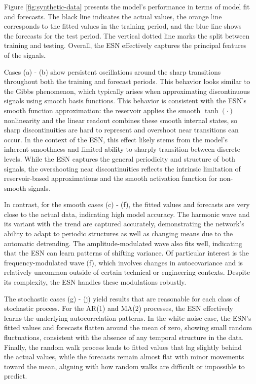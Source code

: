Figure \ref{fig:synthetic-data} presents the model's performance in terms of model fit and forecasts. The black line indicates the actual values, the orange line corresponds to the fitted values in the training period, and the blue line shows the forecasts for the test period. The vertical dotted line marks the split between training and testing. Overall, the ESN effectively captures the principal features of the signals.

Cases (a) - (b) show persistent oscillations around the sharp transitions throughout both the training and forecast periods. This behavior looks similar to the Gibbs phenomenon, which typically arises when approximating discontinuous signals using smooth basis functions. This behavior is consistent with the ESN's smooth function approximation: the reservoir applies the smooth \(\tanh(\cdot)\) nonlinearity and the linear readout combines these smooth internal states, so sharp discontinuities are hard to represent and overshoot near transitions can occur. In the context of the ESN, this effect likely stems from the model's inherent smoothness and limited ability to sharply transition between discrete levels. While the ESN captures the general periodicity and structure of both signals, the overshooting near discontinuities reflects the intrinsic limitation of reservoir-based approximations and the smooth activation function for non-smooth signals.

In contrast, for the smooth cases (c) - (f), the fitted values and forecasts are very close to the actual data, indicating high model accuracy. The harmonic wave and its variant with the trend are captured accurately, demonstrating the network's ability to adapt to periodic structures as well as changing means due to the automatic detrending. The amplitude-modulated wave also fits well, indicating that the ESN can learn patterns of shifting variance. Of particular interest is the frequency-modulated wave (f), which involves changes in autocovariance and is relatively uncommon outside of certain technical or engineering contexts. Despite its complexity, the ESN handles these modulations robustly.

The stochastic cases (g) - (j) yield results that are reasonable for each class of stochastic process. For the AR(1) and MA(2) processes, the ESN effectively learns the underlying autocorrelation patterns. In the white noise case, the ESN's fitted values and forecasts flatten around the mean of zero, showing small random fluctuations, consistent with the absence of any temporal structure in the data. Finally, the random walk process leads to fitted values that lag slightly behind the actual values, while the forecasts remain almost flat with minor movements toward the mean, aligning with how random walks are difficult or impossible to predict.

